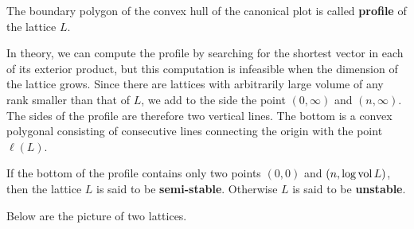 \begin{definition}
    The boundary polygon of the convex hull of the canonical plot is called \textbf{profile} of the lattice $L$.
\end{definition}
In theory, we can compute the profile by searching for the shortest vector in each of its exterior product, but this computation
is infeasible when the dimension of the lattice grows. Since there are lattices with
arbitrarily large volume of any rank smaller than that of $L$, we add to the side the point $(0,\infty)$ and $(n,\infty)$. The sides
of the profile are therefore two vertical lines. The bottom is a convex polygonal consisting of consecutive lines connecting the origin with the point $\ell(L)$.
\begin{definition}\label{ss1}
    If the bottom of the profile contains only two points $(0,0)$ and $(n,\log\operatorname{vol} L)$, then the
    lattice $L$ is said to be \textbf{semi-stable}. Otherwise $L$ is said to be \textbf{unstable}.
\end{definition}
Below are the picture of two lattices.
